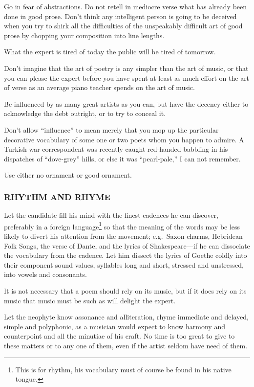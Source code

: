 Go in fear of abstractions. Do not retell in mediocre verse what has
already been done in good prose. Don't think any intelligent person is
going to be deceived when you try to shirk all the difficulties of the
unspeakably difficult art of good prose by chopping your composition
into line lengths.

What the expert is tired of today the public will be tired of tomorrow.

Don't imagine that the art of poetry is any simpler than the art of
music, or that you can please the expert before you have spent at least
as much effort on the art of verse as an average piano teacher spends on
the art of music.

Be influenced by as many great artists as you can, but have the decency
either to acknowledge the debt outright, or to try to conceal it.

Don't allow ``influence'' to mean merely that you mop up the particular
decorative vocabulary of some one or two poets whom you happen to
admire. A Turkish war correspondent was recently caught red-handed
babbling in his dispatches of ``dove-grey'' hills, or else it was
``pearl-pale,'' I can not remember.

Use either no ornament or good ornament.

\subsubsection{RHYTHM AND RHYME}\label{rhythm-and-rhyme}

Let the candidate fill his mind with the finest cadences he can
discover, preferably in a foreign language\footnote{This is for rhythm,
  his vocabulary must of course be found in his native tongue.} so that
the meaning of the words may be less likely to divert his attention from
the movement; e.g.~Saxon charms, Hebridean Folk Songs, the verse of
Dante, and the lyrics of Shakespeare---if he can dissociate the
vocabulary from the cadence. Let him dissect the lyrics of Goethe coldly
into their component sound values, syllables long and short, stressed
and unstressed, into vowels and consonants.

It is not necessary that a poem should rely on its music, but if it does
rely on its music that music must be such as will delight the expert.

Let the neophyte know assonance and alliteration, rhyme immediate and
delayed, simple and polyphonic, as a musician would expect to know
harmony and counterpoint and all the minutiae of his craft. No time is
too great to give to these matters or to any one of them, even if the
artist seldom have need of them.

